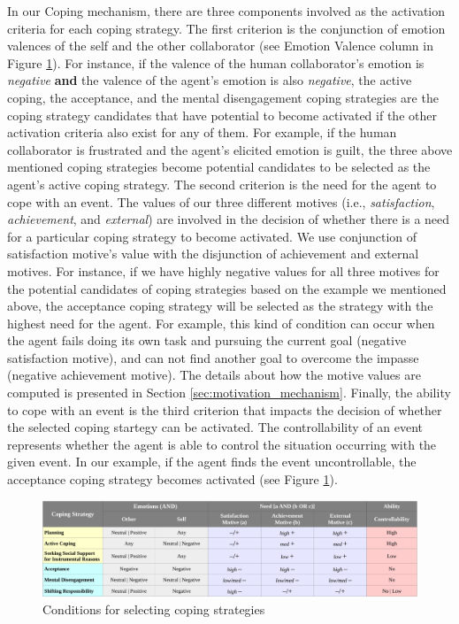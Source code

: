 \documentclass[12pt]{report}
\begin{document}
In our Coping mechanism, there are three components involved as the activation
criteria for each coping strategy. The first criterion is the conjunction of
emotion valences of the self and the other collaborator (see Emotion Valence
column in Figure \ref{fig:coping_strategies}). For instance, if the valence of
the human collaborator's emotion is \textit{negative} \textbf{and} the valence
of the agent's emotion is also \textit{negative}, the active coping, the
acceptance, and the mental disengagement coping strategies are the coping
strategy candidates that have potential to become activated if the other
activation criteria also exist for any of them. For example, if the human
collaborator is frustrated and the agent's elicited emotion is guilt, the three
above mentioned coping strategies become potential candidates to be selected as
the agent's active coping strategy. The second criterion is the need for the
agent to cope with an event. The values of our three different motives (i.e.,
\textit{satisfaction}, \textit{achievement}, and \textit{external}) are involved
in the decision of whether there is a need for a particular coping strategy to
become activated. We use conjunction of satisfaction motive's value with the
disjunction of achievement and external motives. For instance, if we have highly
negative values for all three motives for the potential candidates of coping
strategies based on the example we mentioned above, the acceptance coping
strategy will be selected as the strategy with the highest need for the agent.
For example, this kind of condition can occur when the agent fails doing its own
task and pursuing the current goal (negative satisfaction motive), and can not
find another goal to overcome the impasse (negative achievement motive). The
details about how the motive values are computed is presented in Section
\ref{sec:motivation_mechanism}. Finally, the ability to cope with an event is
the third criterion that impacts the decision of whether the selected coping
startegy can be activated. The controllability of an event represents whether
the agent is able to control the situation occurring with the given event. In
our example, if the agent finds the event uncontrollable, the acceptance coping
strategy becomes activated (see Figure \ref{fig:coping_strategies}).

\begin{figure}
  \centering
  \includegraphics[width=1\textwidth]{figure/coping_algorithms_short_croped.pdf}
  \caption{Conditions for selecting coping strategies}
  \label{fig:coping_strategies}
\end{figure}
\end{document}

